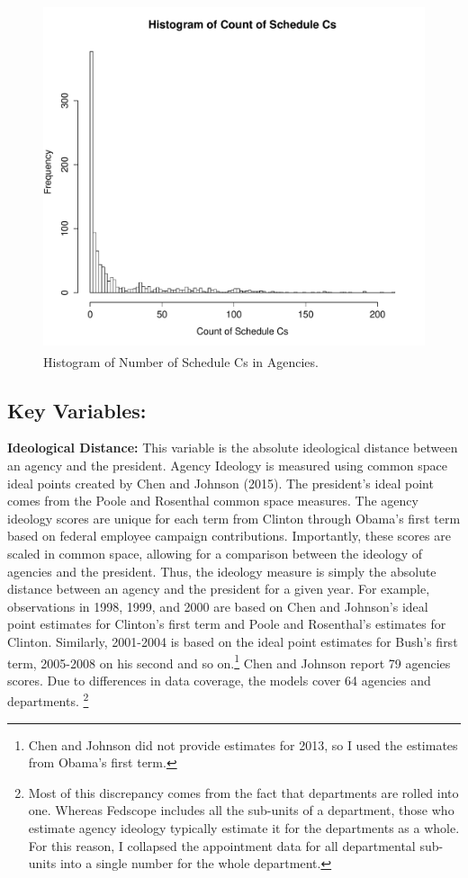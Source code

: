 \documentclass[12pt]{article}
\begin{document}
\begin{figure}[!h]
\begin{center}
\includegraphics[height=4in,width=5in]{HistogramScheduleCCount.pdf}
\caption{Histogram of Number of Schedule Cs in Agencies.}
\end{center}
\end{figure}

\subsection*{Key Variables:}

\textbf{Ideological Distance:} This variable is the absolute ideological distance between an agency and the president. Agency Ideology is measured using common space ideal points created by Chen and Johnson (2015). The president's ideal point comes from the Poole and Rosenthal common space measures. The agency ideology scores are unique for each term from Clinton through Obama's first term based on federal employee campaign contributions. Importantly, these scores are scaled in common space, allowing for a comparison between the ideology of agencies and the president. Thus, the ideology measure is simply the absolute distance between an agency and the president for a given year. For example, observations in 1998, 1999, and 2000 are based on Chen and Johnson's ideal point estimates for Clinton's first term and Poole and Rosenthal's estimates for Clinton. Similarly, 2001-2004 is based on the ideal point estimates for Bush's first term, 2005-2008 on his second and so on.\footnote{Chen and Johnson did not provide estimates for 2013, so I used the estimates from Obama's first term.} Chen and Johnson report 79 agencies scores. Due to differences in data coverage, the models cover 64 agencies and departments. \footnote{Most of this discrepancy comes from the fact that departments are rolled into one. Whereas Fedscope includes all the sub-units of a department, those who estimate agency ideology typically estimate it for the departments as a whole. For this reason, I collapsed the appointment data for all departmental sub-units into a single number for the whole department.}
\end{document}
